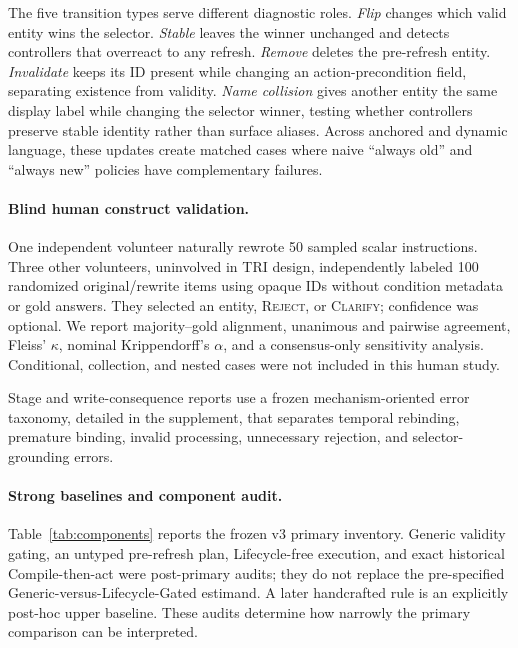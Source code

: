 \documentclass[letterpaper]{article}
\begin{document}
The five transition types serve different diagnostic roles. \emph{Flip} changes which valid
entity wins the selector. \emph{Stable} leaves the winner unchanged and detects controllers
that overreact to any refresh. \emph{Remove} deletes the pre-refresh entity. \emph{Invalidate}
keeps its ID present while changing an action-precondition field, separating existence from
validity. \emph{Name collision} gives another entity the same display label while changing the
selector winner, testing whether controllers preserve stable identity rather than surface
aliases. Across anchored and dynamic language, these updates create matched cases where naive
``always old'' and ``always new'' policies have complementary failures.

\paragraph{Blind human construct validation.}
One independent volunteer naturally rewrote 50 sampled scalar instructions. Three other
volunteers, uninvolved in TRI design, independently labeled 100 randomized original/rewrite
items using opaque IDs without condition metadata or gold answers. They selected an entity,
\textsc{Reject}, or \textsc{Clarify}; confidence was optional. We report majority--gold
alignment, unanimous and pairwise agreement, Fleiss' $\kappa$, nominal Krippendorff's $\alpha$,
and a consensus-only sensitivity analysis. Conditional, collection, and nested cases were not
included in this human study.

Stage and write-consequence reports use a frozen mechanism-oriented error taxonomy, detailed
in the supplement, that separates temporal rebinding, premature binding, invalid processing,
unnecessary rejection, and selector-grounding errors.

\paragraph{Strong baselines and component audit.}
Table~\ref{tab:components} reports the frozen v3 primary inventory. Generic validity gating,
an untyped pre-refresh plan, Lifecycle-free execution, and exact historical Compile-then-act
were post-primary audits; they do not replace the pre-specified Generic-versus-Lifecycle-Gated
estimand. A later handcrafted rule is an explicitly post-hoc upper baseline. These audits determine
how narrowly the primary comparison can be interpreted.
\end{document}
